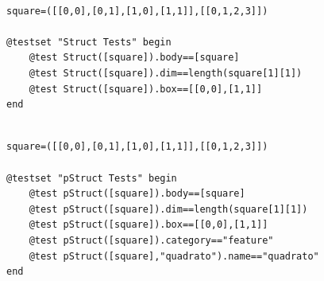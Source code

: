 \documentclass[a4paper,12pt]{article}
\begin{document}
\begin{Verbatim}[fontsize=\footnotesize]

square=([[0,0],[0,1],[1,0],[1,1]],[[0,1,2,3]])

@testset "Struct Tests" begin
	@test Struct([square]).body==[square]
	@test Struct([square]).dim==length(square[1][1])
	@test Struct([square]).box==[[0,0],[1,1]]
end
\end{Verbatim}
\begin{Verbatim}[fontsize=\footnotesize]

square=([[0,0],[0,1],[1,0],[1,1]],[[0,1,2,3]])

@testset "pStruct Tests" begin
    @test pStruct([square]).body==[square]
    @test pStruct([square]).dim==length(square[1][1])
    @test pStruct([square]).box==[[0,0],[1,1]]
    @test pStruct([square]).category=="feature"
    @test pStruct([square],"quadrato").name=="quadrato"
end
\end{Verbatim}
\end{document}
